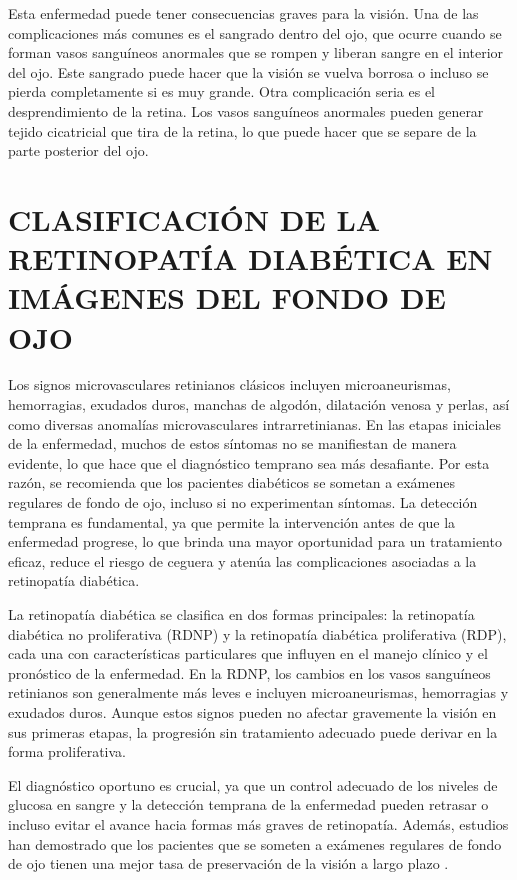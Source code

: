 Esta enfermedad puede tener consecuencias graves para la visión. Una de las complicaciones más comunes es el sangrado dentro del ojo, que ocurre cuando se forman vasos sanguíneos anormales que se rompen y liberan sangre en el interior del ojo. Este sangrado puede hacer que la visión se vuelva borrosa o incluso se pierda completamente si es muy grande. Otra complicación seria es el desprendimiento de la retina. Los vasos sanguíneos anormales pueden generar tejido cicatricial que tira de la retina, lo que puede hacer que se separe de la parte posterior del ojo.

\section{CLASIFICACIÓN DE LA RETINOPATÍA DIABÉTICA EN IMÁGENES DEL FONDO DE OJO}

Los signos microvasculares retinianos clásicos incluyen microaneurismas, hemorragias, exudados duros, manchas de algodón, dilatación venosa y perlas, así como diversas anomalías microvasculares intrarretinianas. En las etapas iniciales de la enfermedad, muchos de estos síntomas no se manifiestan de manera evidente, lo que hace que el diagnóstico temprano sea más desafiante. Por esta razón, se recomienda que los pacientes diabéticos se sometan a exámenes regulares de fondo de ojo, incluso si no experimentan síntomas. La detección temprana es fundamental, ya que permite la intervención antes de que la enfermedad progrese, lo que brinda una mayor oportunidad para un tratamiento eficaz, reduce el riesgo de ceguera y atenúa las complicaciones asociadas a la retinopatía diabética.

La retinopatía diabética se clasifica en dos formas principales: la retinopatía diabética no proliferativa (RDNP) y la retinopatía diabética proliferativa (RDP), cada una con características particulares que influyen en el manejo clínico y el pronóstico de la enfermedad. En la RDNP, los cambios en los vasos sanguíneos retinianos son generalmente más leves e incluyen microaneurismas, hemorragias y exudados duros. Aunque estos signos pueden no afectar gravemente la visión en sus primeras etapas, la progresión sin tratamiento adecuado puede derivar en la forma proliferativa.

El diagnóstico oportuno es crucial, ya que un control adecuado de los niveles de glucosa en sangre y la detección temprana de la enfermedad pueden retrasar o incluso evitar el avance hacia formas más graves de retinopatía. Además, estudios han demostrado que los pacientes que se someten a exámenes regulares de fondo de ojo tienen una mejor tasa de preservación de la visión a largo plazo .

